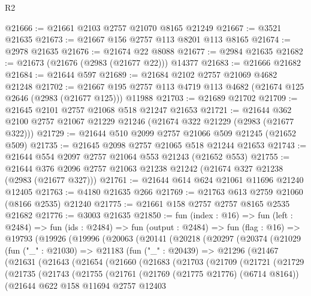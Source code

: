 \begin{lexlean}{R2}
\begin{coremodule}
@21666 := @21661 @2103 @2757 @21070 @8165 @21249
@21667 := @3521 @21635
@21673 := @21667 @156 @2757 @113 @8201 @113 @8165
@21674 := @2978 @21635
@21676 := @21674 @22 @8088
@21677 := @2984 @21635
@21682 := @21673 (@21676 (@2983 (@21677 @22))) @14377
@21683 := @21666 @21682
@21684 := @21644 @597
@21689 := @21684 @2102 @2757 @21069 @4682 @21248
@21702 := @21667 @195 @2757 @113 @4719 @113 @4682 (@21674 @125 @2646 (@2983 (@21677 @125))) @11988
@21703 := @21689 @21702
@21709 := @21645 @2101 @2757 @21068 @518 @21247 @21653
@21721 := @21644 @362 @2100 @2757 @21067 @21229 @21246 (@21674 @322 @21229 (@2983 (@21677 @322)))
@21729 := @21644 @510 @2099 @2757 @21066 @509 @21245 (@21652 @509)
@21735 := @21645 @2098 @2757 @21065 @518 @21244 @21653
@21743 := @21644 @554 @2097 @2757 @21064 @553 @21243 (@21652 @553)
@21755 := @21644 @376 @2096 @2757 @21063 @21238 @21242 (@21674 @327 @21238 (@2983 (@21677 @327)))
@21761 := @21644 @614 @624 @21061 @11696 @21240 @12405
@21763 := @4180 @21635 @266
@21769 := @21763 @613 @2759 @21060 (@8166 @2535) @21240
@21775 := @21661 @158 @2757 @2757 @8165 @2535 @21682
@21776 := @3003 @21635
@21850 := fun (index : @16) =>
  fun (left : @2484) =>
  fun (ids : @2484) =>
  fun (output : @2484) =>
  fun (flag : @16) =>
  @19793
    (@19926
      (@19996
        (@20063
          (@20141
            (@20218
              (@20297
                (@20374
                  (@21029
                    (fun ("_" : @21030) =>
                    @21183
                      (fun ("_" : @20439) =>
                      @21296
                        (@21467
                          (@21631
                            (@21643
                              (@21654
                                (@21660
                                  (@21683
                                    (@21703
                                      (@21709
                                        (@21721
                                          (@21729
                                            (@21735
                                              (@21743
                                                (@21755
                                                  (@21761
                                                    (@21769 (@21775 @21776) (@6714 @8164))
                                                    (@21644
                                                      @622
                                                      @158
                                                      @11694
                                                      @2757
                                                      @12403

\end{coremodule}
\end{lexlean}
